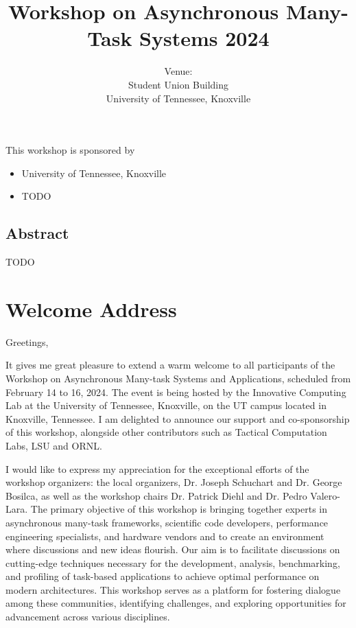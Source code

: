 \documentclass[12pt,letterpaper]{book}
\title{Workshop on Asynchronous Many-Task Systems 2024}
\author{Venue: \\ Student Union Building\\University of Tennessee, Knoxville}
\begin{document}
\frontmatter

\maketitle

This workshop is sponsored by

\begin{itemize}
\item University of Tennessee, Knoxville
\item TODO
\end{itemize}

\newpage

\section*{Abstract}


TODO

\chapter{Welcome Address}


Greetings,

\noindent It gives me great pleasure to extend a warm welcome to all participants
of the Workshop on Asynchronous Many-task Systems and Applications,
scheduled from February 14 to 16, 2024. The event is being hosted by the
Innovative Computing Lab at the University of Tennessee, Knoxville, on
the UT campus located in Knoxville, Tennessee. I am delighted to
announce our support and co-sponsorship of this workshop, alongside
other contributors such as Tactical Computation Labs, LSU and ORNL.

\noindent I would like to express my appreciation for the exceptional efforts of
the workshop organizers: the local organizers, Dr. Joseph Schuchart and
Dr. George Bosilca, as well as the workshop chairs Dr. Patrick Diehl and
Dr. Pedro Valero-Lara. The primary objective of this workshop is
bringing together experts in asynchronous many-task frameworks,
scientific code developers, performance engineering specialists, and
hardware vendors and to create an environment where discussions and new
ideas flourish. Our aim is to facilitate discussions on cutting-edge
techniques necessary for the development, analysis, benchmarking, and
profiling of task-based applications to achieve optimal performance on
modern architectures. This workshop serves as a platform for fostering
dialogue among these communities, identifying challenges, and exploring
opportunities for advancement across various disciplines.
\end{document}
